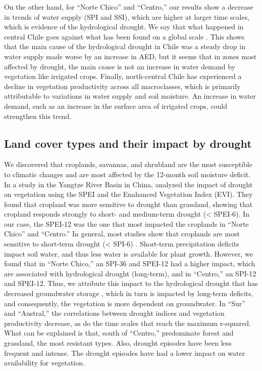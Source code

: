 \documentclass[
  authoryear,
  preprint,
  3p,
  onecolumn]{elsarticle}
\begin{document}
On the other hand, for ``Norte Chico'' and ``Centro,'' our results show
a decrease in trends of water supply (SPI and SSI), which are higher at
larger time scales, which is evidence of the hydrological drought. We
say that what happened in central Chile goes against what has been found
on a global scale \citep{Vicente-Serrano2022, Kogan2020}. This shows
that the main cause of the hydrological drought in Chile was a steady
drop in water supply made worse by an increase in AED, but it seems that
in zones most affected by drought, the main cause is not an increase in
water demand by vegetation like irrigated crops. Finally, north-central
Chile has experienced a decline in vegetation productivity across all
macroclasses, which is primarily attributable to variations in water
supply and soil moisture. An increase in water demand, such as an
increase in the surface area of irrigated crops, could strengthen this
trend.

\hypertarget{land-cover-types-and-their-impact-by-drought}{%
\subsection{Land cover types and their impact by
drought}\label{land-cover-types-and-their-impact-by-drought}}

We discovered that croplands, savannas, and shrubland are the most
susceptible to climatic changes and are most affected by the 12-month
soil moisture deficit. In a study in the Yangtze River Basin in China,
\citet{Jiang2020} analyzed the impact of drought on vegetation using the
SPEI and the Enahanced Vegetation Index (EVI). They found that cropland
was more sensitive to drought than grassland, showing that cropland
responds strongly to short- and medium-term drought (\textless{}
SPEI-6). In our case, the SPEI-12 was the one that most impacted the
croplands in ``Norte Chico'' and ``Centro.'' In general, most studies
show that croplands are most sensitive to short-term drought
(\textless{} SPI-6)
\citep{Zambrano2016, Potopova2015, Dai2020, Rhee2010}. Short-term
precipitation deficits impact soil water, and thus less water is
available for plant growth. However, we found that in ``Norte Chico,''
an SPI-36 and SPEI-12 had a higher impact, which are associated with
hydrological drought (long-term), and in ``Centro,'' an SPI-12 and
SPEI-12. Thus, we attribute this impact to the hydrological drought that
has decreased groundwater storage \citep{Taucare2024}, which in turn is
impacted by long-term deficits, and consequently, the vegetation is more
dependent on groundwater. In ``Sur'' and ``Austral,'' the correlations
between drought indices and vegetation productivity decrease, as do the
time scales that reach the maximum r-squared. What can be explained is
that, south of ``Centro,'' predominate forest and grassland, the most
resistant types. Also, drought episodes have been less frequent and
intense. The drought episodes have had a lower impact on water
availability for vegetation.
\end{document}
